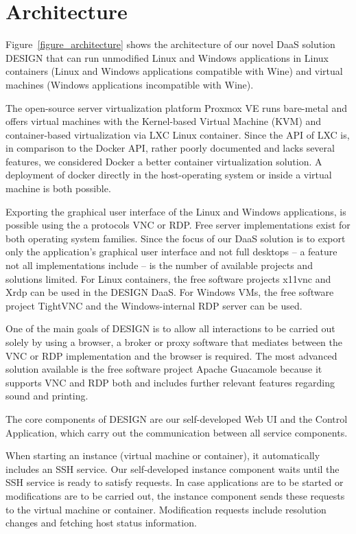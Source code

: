 \documentclass[runningheads]{llncs}
\begin{document}
\section{Architecture}
\label{sec:RecommendDaaSarchitecture}
% 

Figure~\ref{figure_architecture} shows the architecture of our novel DaaS solution DESIGN that can run unmodified Linux and Windows applications in Linux containers (Linux and Windows applications compatible with Wine) and virtual machines (Windows applications incompatible with Wine).

The open-source server virtualization platform Proxmox VE runs bare-metal and offers virtual machines with the Kernel-based Virtual Machine (KVM) and container-based virtualization via LXC Linux container. Since the API of LXC is, in comparison to the Docker API, rather poorly documented and lacks several features, we considered Docker a better container virtualization solution. A deployment of docker directly in the host-operating system or inside a virtual machine is both possible.

Exporting the graphical user interface of the Linux and Windows applications,
is possible using the a protocols VNC or RDP. Free server implementations exist for both operating system families. Since the focus of our DaaS solution is to export only the application's graphical user interface and not full desktops -- a feature not all implementations include -- is the number of available projects and solutions limited. 
For Linux containers, the free software projects x11vnc and Xrdp can be used in the DESIGN DaaS. For Windows VMs, the free software project TightVNC and the Windows-internal RDP server can be used. 

One of the main goals of DESIGN is to allow all interactions to be carried out solely by using a browser, a broker or proxy software that mediates between the VNC or RDP implementation and the browser is required. The most advanced solution available is the free software project Apache Guacamole because it supports VNC and RDP both and includes further relevant features regarding sound and printing.

The core components of DESIGN are our self-developed Web UI and the Control Application, which carry out the communication between all service components. 

When starting an instance (virtual machine or container), it automatically includes an SSH service. Our self-developed instance component waits until the SSH service is ready to satisfy requests. In case applications are to be started or modifications are to be carried out, the instance component sends these requests to the virtual machine or container. Modification requests include resolution changes and fetching host status information.
\end{document}
